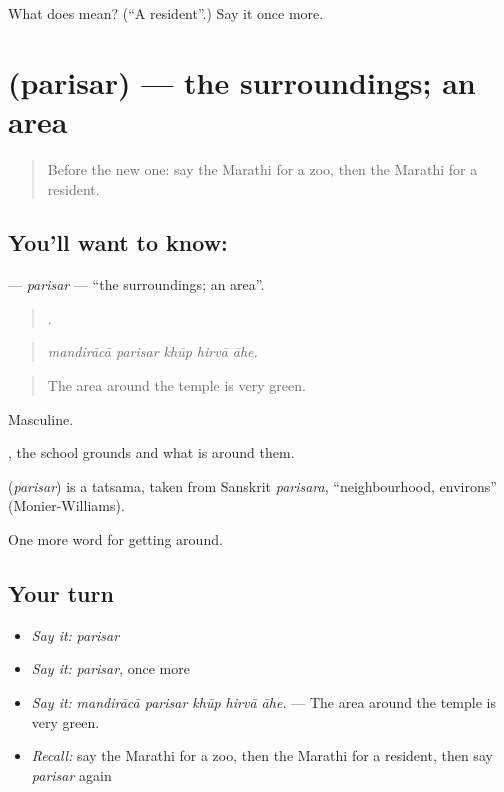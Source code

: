 \begin{tcolorbox}[breakable,colback=teal!4,colframe=teal!35!black,title={Before you move on}]
What does  mean? (\textquotedblleft{}A resident\textquotedblright{}.) Say it once more.
\end{tcolorbox}
\section[\texorpdfstring{\mr{परिसर} (parisar)}{परिसर (parisar)}]{ (parisar) — the surroundings; an area}

\label{lesson:MR-C420-parisar}



\begin{quote}
Before the new one: say the Marathi for a zoo, then the Marathi for a resident.
\end{quote}

\subsection*{You'll want to know: }
\textbf{} — \emph{parisar} — \textquotedblleft{}the surroundings; an area\textquotedblright{}.

\begin{quote}
    .
\end{quote}

\begin{quote}
\emph{mandirācā parisar khūp hirvā āhe.}
\end{quote}

\begin{quote}
The area around the temple is very green.
\end{quote}

Masculine.

 , the school grounds and what is around them.

\begin{cousinweb}
\textbf{} (\emph{parisar}) is a tatsama, taken from Sanskrit \emph{parisara}, \textquotedblleft{}neighbourhood, environs\textquotedblright{} (Monier-Williams).
\end{cousinweb}

\begin{grammarlens}[title={What you've built}]
One more word for getting around.
\end{grammarlens}

\subsection*{Your turn}
\begin{itemize}
\raggedright
  \item \emph{Say it:} \emph{parisar}
  \item \emph{Say it:} \emph{parisar}, once more
  \item \emph{Say it:} \emph{mandirācā parisar khūp hirvā āhe.} — The area around the temple is very green.
  \item \emph{Recall:} say the Marathi for a zoo, then the Marathi for a resident, then say \emph{parisar} again
\end{itemize}

